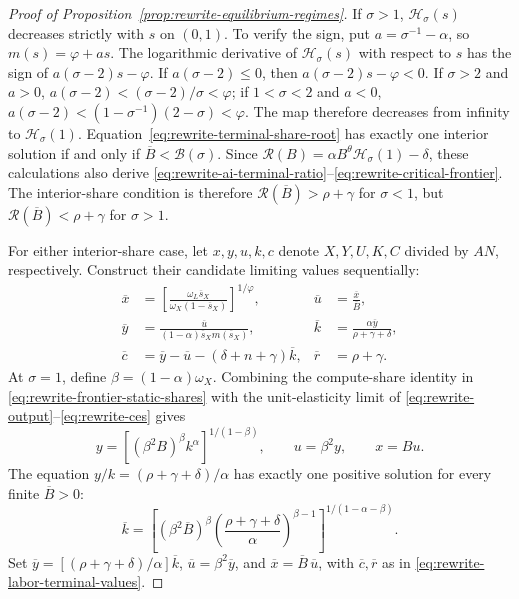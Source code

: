 \begin{proof}[Proof of Proposition~\ref{prop:rewrite-equilibrium-regimes}]
If $\sigma>1$, $\mathcal H_\sigma(s)$ decreases strictly with $s$ on $(0,1)$.
To verify the sign, put $a=\sigma^{-1}-\alpha$, so $m(s)=\varphi+as$.
The logarithmic derivative of $\mathcal H_\sigma(s)$ with respect to $s$
has the sign of $a(\sigma-2)s-\varphi$.
If $a(\sigma-2)\leq0$, then $a(\sigma-2)s-\varphi<0$. If $\sigma>2$ and $a>0$,
$a(\sigma-2)<(\sigma-2)/\sigma<\varphi$; if $1<\sigma<2$ and $a<0$,
$a(\sigma-2)<(1-\sigma^{-1})(2-\sigma)<\varphi$.
The map therefore decreases from infinity to $\mathcal H_\sigma(1)$.
Equation~\eqref{eq:rewrite-terminal-share-root} has exactly one interior
solution if and only if $\overline B<\mathcal B(\sigma)$.
Since $\mathcal R(B)=\alpha B^\theta\mathcal H_\sigma(1)-\delta$,
these calculations also derive
\eqref{eq:rewrite-ai-terminal-ratio}--\eqref{eq:rewrite-critical-frontier}.
The interior-share condition is therefore
$\mathcal R(\overline B)>\rho+\gamma$ for $\sigma<1$, but
$\mathcal R(\overline B)<\rho+\gamma$ for $\sigma>1$.

For either interior-share case, let $x,y,u,k,c$ denote $X,Y,U,K,C$ divided
by $AN$, respectively. Construct their candidate limiting values sequentially:
\begin{align}
 \overline x&=
 \left[\frac{\omega_L\overline s_X}
 {\omega_X(1-\overline s_X)}\right]^{1/\varphi},
 &\overline u&=\frac{\overline x}{\overline B},\nonumber\\
 \overline y&=
 \frac{\overline u}{(1-\alpha)\overline s_Xm(\overline s_X)},
 &\overline k&=\frac{\alpha\overline y}{\rho+\gamma+\delta},\nonumber\\
 \overline c&=\overline y-\overline u
       -(\delta+n+\gamma)\overline k,
 &\overline r&=\rho+\gamma.
 \label{eq:rewrite-labor-terminal-values}
\end{align}
At $\sigma=1$, define $\beta=(1-\alpha)\omega_X$.
Combining the compute-share identity in
\eqref{eq:rewrite-frontier-static-shares} with the unit-elasticity limit of
\eqref{eq:rewrite-output}--\eqref{eq:rewrite-ces} gives
\[
 y=\left[(\beta^2B)^\beta k^\alpha\right]^{1/(1-\beta)},
 \qquad u=\beta^2y,\qquad x=Bu.
\]
The equation $y/k=(\rho+\gamma+\delta)/\alpha$ has exactly one positive
solution for every finite $\overline B>0$:
\begin{equation}
 \overline k=
 \left[(\beta^2\overline B)^\beta
 \left(\frac{\rho+\gamma+\delta}{\alpha}\right)^{\beta-1}
 \right]^{1/(1-\alpha-\beta)}.
 \label{eq:rewrite-unit-terminal-capital}
\end{equation}
Set
$\overline y=[(\rho+\gamma+\delta)/\alpha]\overline k$,
$\overline u=\beta^2\overline y$,
and $\overline x=\overline B\,\overline u$, with $\overline c,\overline r$
as in \eqref{eq:rewrite-labor-terminal-values}.


\end{proof}
